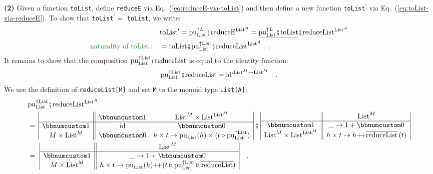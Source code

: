 \textbf{(2)} Given a function \lstinline!toList!, define \lstinline!reduceE!
via Eq.~(\ref{eq:reduceE-via-toList}) and then define a new function
\lstinline!toList!$^{\prime}$ via Eq.~(\ref{eq:toList-via-reduceE}).
To show that \lstinline!toList!$^{\prime}=$ \lstinline!toList!,
we write:
\begin{align*}
 & \text{toList}^{\prime}=\text{pu}_{\text{List}}^{\uparrow L}\bef\text{reduceE}^{\text{List}^{A}}=\gunderline{\text{pu}_{\text{List}}^{\uparrow L}\bef\text{toList}}\bef\text{reduceList}^{\text{List}^{A}}\\
{\color{greenunder}\text{naturality of }\text{toList}:}\quad & =\text{toList}\bef\text{pu}_{\text{List}}^{\uparrow\text{List}}\bef\text{reduceList}^{\text{List}^{A}}\quad.
\end{align*}
It remains to show that the composition $\text{pu}_{\text{List}}^{\uparrow\text{List}}\bef\text{reduceList}$
is equal to the identity function:
\begin{equation}
\text{pu}_{\text{List}}^{\uparrow\text{List}}\bef\text{reduceList}=\text{id}^{:\text{List}^{M}\rightarrow\text{List}^{M}}\quad.\label{eq:identity-for-reduceList-and-pure}
\end{equation}
We use the definition of \lstinline!reduceList[M]! and set \lstinline!M!
to the monoid type \lstinline!List[A]!:
\begin{align*}
 & \text{pu}_{\text{List}}^{\uparrow\text{List}}\bef\text{reduceList}^{\text{List}^{A}}\\
 & =\,\begin{array}{|c||cc|}
 & \bbnum 1 & \text{List}^{M}\times\text{List}^{\text{List}^{M}}\\
\hline \bbnum 1 & \text{id} & \bbnum 0\\
M\times\text{List}^{M} & \bbnum 0 & h\times t\rightarrow\text{pu}_{\text{List}}(h)\times(t\triangleright\text{pu}_{\text{List}}^{\uparrow\text{List}})
\end{array}\,\bef\,\begin{array}{|c||c|}
 & \text{List}^{M}\\
\hline \bbnum 1 & \_\rightarrow1+\bbnum 0\\
\text{List}^{M}\times\text{List}^{\text{List}^{M}} & h\times t\rightarrow h\pplus\overline{\text{reduceList}}\left(t\right)
\end{array}\\
 & =\,\,\begin{array}{|c||c|}
 & \text{List}^{M}\\
\hline \bbnum 1 & \_\rightarrow1+\bbnum 0\\
M\times\text{List}^{M} & h\times t\rightarrow\text{pu}_{\text{List}}(h)\pplus(t\triangleright\text{pu}_{\text{List}}^{\uparrow\text{List}}\triangleright\overline{\text{reduceList}})
\end{array}\quad.
\end{align*}
